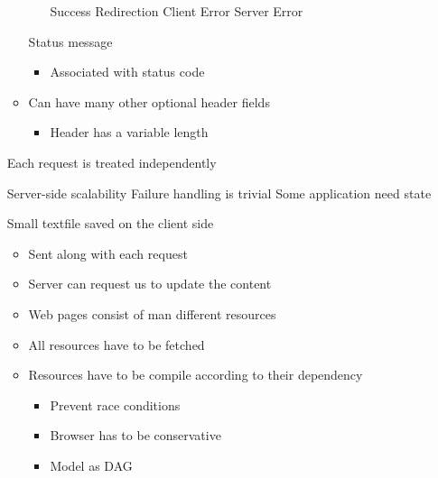 \begin{itemize}
\begin{itemize}
\begin{itemize}
                     Success
                     Redirection
                     Client Error
                     Server Error
                \end{itemize}
             Status message
                \begin{itemize}
                    \item Associated with status code
                \end{itemize}
            \item Can have many other optional header fields
                \begin{itemize}
                    \item Header has a variable length
                \end{itemize}
        \end{itemize}
        \begin{itemize}
             Each request is treated independently 
                \begin{itemize}
                    \ipro Server-side scalability
                    \ipro Failure handling is trivial
                    \icon Some application need state
                \end{itemize}
             Small textfile saved on the client side
                \begin{itemize}
                    \item Sent along with each request
                    \item Server can request us to update the content
                \end{itemize}
        \end{itemize}
        \begin{itemize}
            \item Web pages consist of man different resources
            \item All resources have to be fetched
            \item Resources have to be compile according to their dependency
                \begin{itemize}
                    \item Prevent race conditions
                    \item Browser has to be conservative
                    \item Model as DAG
                        \begin{itemize}

\end{itemize}
\end{itemize}
\end{itemize}
\end{itemize}
